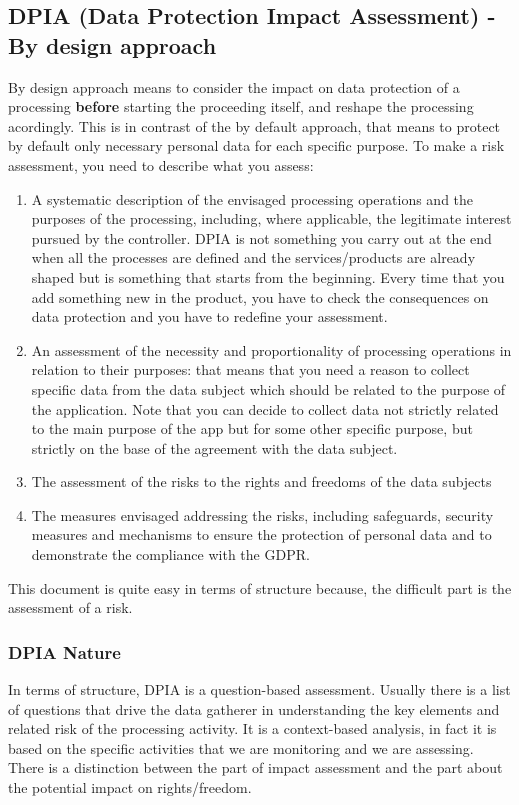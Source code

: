 \subsection{DPIA (Data Protection Impact Assessment) - By design approach}
\label{sect:DPIA}
By design approach means to consider the impact on data protection of a processing \textbf{before} starting the proceeding itself, and reshape the processing acordingly. 
This is in contrast of the by default approach, that means to protect by default only  necessary personal data for each specific purpose.
To make a risk assessment, you need to describe what you assess:
\begin{enumerate}
    \item A systematic description of the envisaged processing operations and the purposes of the processing, including, where applicable, the legitimate interest pursued by the controller. DPIA is not something you carry out at the end when all the processes are defined and the services/products are already shaped but is something that starts from the beginning. Every time that you add something new in the product, you have to check the consequences on data protection and you have to redefine your assessment. 
    \item An assessment of the necessity and proportionality of processing operations in relation to their purposes: that means that you need a reason to collect specific data from the data subject which should be related to the purpose of the application.
    Note that you can decide to collect data not strictly related to the main purpose of the app but for some other specific purpose, but strictly on the base of the agreement with the data subject.
    \item The assessment of the risks to the rights and freedoms of the data subjects
    \item The measures envisaged addressing the risks, including safeguards, security measures and mechanisms to ensure the protection of personal data and to demonstrate the compliance with the GDPR.
\end{enumerate}
This document is quite easy in terms of structure because, the difficult part is the assessment of a risk.

\subsubsection{DPIA Nature}
In terms of structure, DPIA is a question-based assessment. Usually there is a list of questions that drive the data gatherer in understanding the key elements and related risk of the processing activity.
It is a context-based analysis, in fact it is based on the specific activities that we are monitoring and we are assessing. There is a distinction between the part of impact assessment and the part about the potential impact on rights/freedom.

